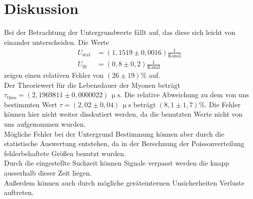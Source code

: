 \section{Diskussion}
\label{sec:Diskussion}
Bei der Betrachtung der Untergrundwerte fällt auf, das diese sich leicht von einander unterscheiden.
Die Werte
\begin{align*}
  U_{\text{stat}}&=(1,1519\pm0,0016)\frac{1}{\text{Kanal}}\\
  U_{\text{fit}}&=(0,8 \pm 0,2) \frac{1}{\text{Kanal}}
\end{align*}
zeigen einen relativen Fehler von $(26\pm19)\%$ auf.\\
Der Theoriewert für die Lebensdauer der Myonen beträgt $\tau_{\text{theo}}=(2,1969811\pm0,0000022)\,\upmu\text{s}$\cite{Lebensdauer}.
Die relative Abweichung zu dem von uns bestimmten Wert $\tau=(2,02\pm0,04)\,\upmu\text{s}$ beträgt $(8,1\pm1,7)\%$.
Die Fehler können hier nicht weiter disskutiert werden, da die benutzten Werte nicht von uns aufgenommen wurden.\\
Mögliche Fehler bei der Untergrund Bestimmung können aber durch die statistische Auswertung entstehen, da in der Berechnung der
Poissonverteilung fehlerbehaftete Größen benutzt wurden.\\
Durch die eingestellte Suchzeit können Signale verpasst werden die knapp ausserhalb dieser Zeit liegen.\\
 Außerdem können auch durch mögliche geräteinternen Unsicherheiten Verluste auftreten.\\
